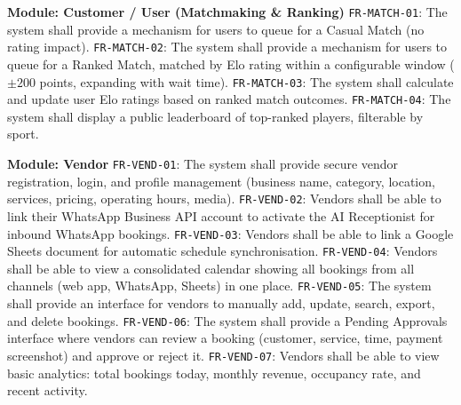 \begin{outline}
  \1 \textbf{Module: Customer / User (Matchmaking \& Ranking)}
  \2 \texttt{FR-MATCH-01}: The system shall provide a mechanism for users to queue
       for a Casual Match (no rating impact).
  \2 \texttt{FR-MATCH-02}: The system shall provide a mechanism for users to queue
       for a Ranked Match, matched by Elo rating within a configurable window
       ($\pm 200$ points, expanding with wait time).
  \2 \texttt{FR-MATCH-03}: The system shall calculate and update user Elo ratings
       based on ranked match outcomes.
  \2 \texttt{FR-MATCH-04}: The system shall display a public leaderboard of top-ranked
       players, filterable by sport.

  \1 \textbf{Module: Vendor}
  \2 \texttt{FR-VEND-01}: The system shall provide secure vendor registration, login,
       and profile management (business name, category, location, services, pricing,
       operating hours, media).
  \2 \texttt{FR-VEND-02}: Vendors shall be able to link their WhatsApp Business API
       account to activate the AI Receptionist for inbound WhatsApp bookings.
  \2 \texttt{FR-VEND-03}: Vendors shall be able to link a Google Sheets document for
       automatic schedule synchronisation.
  \2 \texttt{FR-VEND-04}: Vendors shall be able to view a consolidated calendar
       showing all bookings from all channels (web app, WhatsApp, Sheets) in one place.
  \2 \texttt{FR-VEND-05}: The system shall provide an interface for vendors to
       manually add, update, search, export, and delete bookings.
  \2 \texttt{FR-VEND-06}: The system shall provide a Pending Approvals interface
       where vendors can review a booking (customer, service, time, payment screenshot)
       and approve or reject it.
  \2 \texttt{FR-VEND-07}: Vendors shall be able to view basic analytics: total
       bookings today, monthly revenue, occupancy rate, and recent activity.


\end{outline}
